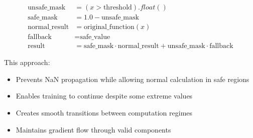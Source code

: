 \begin{equationbox}[title=Gradient Detachment With Safe Masking]
\begin{align}
    \text{unsafe\_mask} &= (x > \text{threshold}).float() \\
    \text{safe\_mask} &= 1.0 - \text{unsafe\_mask} \\
    \text{normal\_result} &= \text{original\_function}(x) \\
    \text{fallback} &= \text{safe\_value} \\
    \text{result} &= \text{safe\_mask} \cdot \text{normal\_result} + \text{unsafe\_mask} \cdot \text{fallback}
\end{align}

This approach:
\begin{itemize}
    \item Prevents NaN propagation while allowing normal calculation in safe regions
    \item Enables training to continue despite some extreme values
    \item Creates smooth transitions between computation regimes
    \item Maintains gradient flow through valid components
\end{itemize}
\end{equationbox}

